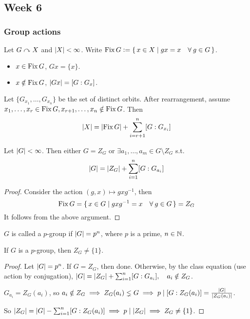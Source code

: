 \subsection{Week 6}
\subsubsection{Group actions }

\begin{definition}
  Let $G \curvearrowright X$ and $\lvert X\rvert < \infty$.
  Write $\Fix G \defeq \{\, x \in X \mid gx = x \quad \forall g \in G \,\}$.
\end{definition}

\begin{itemize}
  \item $x \in \operatorname{Fix} G$, $Gx = \{ x \}$.
  \item $x \notin \operatorname{Fix} G$, $\lvert Gx\rvert = [G : G_x]$.
\end{itemize}

Let $\{ G_{x_1}, \dots, G_{x_n} \}$ be the set of distinct orbits.
After rearrangement, assume $x_1, \dots, x_r \in \operatorname{Fix} G,
x_{r+1}, \dots, x_n \notin \operatorname{Fix} G$. Then
\[
  \lvert X\rvert = \lvert\operatorname{Fix} G\rvert + \sum_{i=r+1}^{n} [G : G_{x_i}]
\]

\begin{theorem}
  Let $\lvert G\rvert < \infty$. Then either $G = Z_G$ or
  $\exists a_1, \dots, a_m \in G \setminus Z_G$ s.t.
  \[
    \lvert G\rvert = \lvert Z_G\rvert + \sum_{i=1}^{n} [G : G_{a_i}]
  \]
  \begin{proof}
    Consider the action $(g, x) \mapsto gxg^{-1}$, then
    \[
      \Fix G = \{\, x \in G \mid gxg^{-1} = x \quad \forall g \in G \,\}
      = Z_G
    \]
    It follows from the above argument.
  \end{proof}
\end{theorem}

\begin{definition}
  $G$ is called a $p$-group if $\lvert G\rvert = p^n$, where $p$ is a prime,
  $n \in \mathbb{N}$.
\end{definition}

\begin{prop}
  If $G$ is a $p$-group, then $Z_G \ne \{ 1 \}$.
  \begin{proof}
    Let $\lvert G\rvert = p^n$. If $G = Z_G$, then done.
    Otherwise, by the class equation (use action by conjugation),
    $\lvert G\rvert = \lvert Z_G\rvert + \sum_{i=1}^{n} [G : G_{a_i}], \quad a_i \notin Z_G$.

    $G_{a_i} = Z_G(a_i)$, so $a_i \notin Z_G \implies Z_G(a_i) \lneq G
    \implies p \mid [G:Z_G(a_i)] = \frac{\lvert G\rvert}{\lvert Z_G(a_i)\rvert}$.

    So $\lvert Z_G\rvert = \lvert G\rvert - \sum_{i=1}^{n} [G : Z_G(a_i)]
    \implies p \mid \lvert Z_G\rvert \implies Z_G \ne \{ 1 \}$.
  \end{proof}
  \label{prop:pgroup}
\end{prop}

